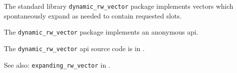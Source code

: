
The standard library {\tt dynamic\_rw\_vector} package implements vectors which 
spontaneously expand as needed to contain requested slots.

The {\tt dynamic\_rw\_vector} package implements an anonymous api.


The {\tt dynamic\_rw\_vector} api source code is in .


See also:  {\tt expanding\_rw\_vector} in .


